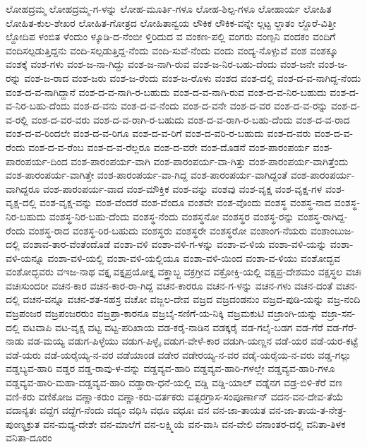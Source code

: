 ಲೋಹದ್ರಮ್ಮ
ಲೋಹದ್ರಮ್ಮ-ಗ-ಳನ್ನು
ಲೋಹ-ಮೂರ್ತಿ-ಗಳೂ
ಲೋಹ-ಶಿಲ್ಪ-ಗಳೂ
ಲೋಹಾರ್ಯ
ಲೋಹಿತ
ಲೋಹಿತ-ಕುಲ-ಶೇಖರ
ಲೋಹಿತ-ಗೋತ್ರದ
ಲೋಹಿತಾನ್ವಯ
ಲೌಕಿಕ
ಲೌಕಿಕ-ವನ್ನೇ
ಲ್ಗಟ್ಟ
ಲ್ದಾತಂ
ಲ್ದೊರೆ-ವಿತ್ತೀ
ಲ್ದೋದಿಪ
ಳಂಬಿತ
ಳೆಂದುಂ
ಳ್ಕೂಡಿ-ದ-ನೆಂಬೀ
ಳ್ತಿರಿದುದ
ವ
ವಂಕಣ-ಪಲ್ಲಿ
ವಂಗರು
ವಂಣ್ಪನಿ
ವಂದಕಂ
ವಂದಿಗೆ
ವಂದಿಸಲ್ಪಡುತ್ತಿದ್ದನು
ವಂದಿ-ಸಲ್ಪಡುತ್ತಿದ್ದ-ನೆಂದು
ವಂದಿ-ಸುವೆ-ನೆಂದು
ವಂದು
ವಂದ್ಯ-ನೊಳ್ಪುವೆ
ವಂಶ
ವಂಶಕ್ಕೂ
ವಂಶಕ್ಕೆ
ವಂಶ-ಗಳು
ವಂಶ-ಜ-ನಾ-ಗಿದ್ದು
ವಂಶ-ಜ-ನಾಗಿ-ರುವ
ವಂಶ-ಜ-ನಿರ-ಬಹು-ದೆಂದು
ವಂಶ-ಜನೇ
ವಂಶ-ಜ-ರನ್ನು
ವಂಶ-ಜ-ರಾದ
ವಂಶ-ಜರು
ವಂಶ-ಜ-ರೆಂದು
ವಂಶ-ಜ-ರೊಳು
ವಂಶದ
ವಂಶ-ದಲ್ಲಿ
ವಂಶ-ದ-ವ-ನಾಗಿದ್ದ-ನೆಂದು
ವಂಶ-ದ-ವ-ನಾಗಿದ್ದಾನೆ
ವಂಶ-ದ-ವ-ನಾಗಿ-ರ-ಬಹುದು
ವಂಶ-ದ-ವ-ನಾಗಿ-ರುವ
ವಂಶ-ದ-ವ-ನಿರ-ಬಹುದು
ವಂಶ-ದ-ವ-ನಿರ-ಬಹು-ದೆಂದು
ವಂಶ-ದ-ವನು
ವಂಶ-ದ-ವ-ನೆಂದು
ವಂಶ-ದ-ವನೇ
ವಂಶ-ದ-ವರ
ವಂಶ-ದ-ವ-ರನ್ನು
ವಂಶ-ದ-ವ-ರಲ್ಲಿ
ವಂಶ-ದ-ವರ-ವರು
ವಂಶ-ದ-ವ-ರಾಗಿ-ರ-ಬಹುದು
ವಂಶ-ದ-ವ-ರಾಗಿ-ರ-ಬಹು-ದೆಂದು
ವಂಶ-ದ-ವ-ರಾದ
ವಂಶ-ದ-ವ-ರಿಂದಲೇ
ವಂಶ-ದ-ವ-ರಿಗೂ
ವಂಶ-ದ-ವ-ರಿಗೆ
ವಂಶ-ದ-ವರಿ-ರ-ಬಹುದು
ವಂಶ-ದ-ವರು
ವಂಶ-ದ-ವ-ರೆಂದು
ವಂಶ-ದ-ವ-ರೆಂಬ
ವಂಶ-ದ-ವ-ರೆಲ್ಲರೂ
ವಂಶ-ದ-ವರೇ
ವಂಶ-ದೊಡನೆ
ವಂಶ-ಪಾರಂಪರ್ಯ
ವಂಶ-ಪಾರಂಪರ್ಯ-ದಿಂದ
ವಂಶ-ಪಾರಂಪರ್ಯ-ವಾಗಿ
ವಂಶ-ಪಾರಂಪರ್ಯ-ವಾ-ಗಿತ್ತು
ವಂಶ-ಪಾರಂಪರ್ಯ-ವಾಗಿತ್ತೆಂದು
ವಂಶ-ಪಾರಂಪರ್ಯ-ವಾಗಿತ್ತೇ
ವಂಶ-ಪಾರಂಪರ್ಯ-ವಾ-ಗಿದ್ದ
ವಂಶ-ಪಾರಂಪರ್ಯ-ವಾಗಿದ್ದಂತೆ
ವಂಶ-ಪಾರಂಪರ್ಯ-ವಾಗಿದ್ದರೂ
ವಂಶ-ಪಾರಂಪರ್ಯ-ವಾದ
ವಂಶ-ಮೌಕ್ತಿಕ
ವಂಶ-ವನ್ನು
ವಂಶವು
ವಂಶ-ವೃಕ್ಷ
ವಂಶ-ವೃಕ್ಷ-ಗಳ
ವಂಶ-ವೃಕ್ಷ-ದಲ್ಲಿ
ವಂಶ-ವೃಕ್ಷ-ವನ್ನು
ವಂಶ-ವೆಂದರೆ
ವಂಶ-ವೆಂದೂ
ವಂಶವೇ
ವಂಶ-ವೊಂದು
ವಂಶಸ್ಥ
ವಂಶಸ್ಥ-ನಾದ
ವಂಶಸ್ಥ-ನಿರ-ಬಹುದು
ವಂಶಸ್ಥ-ನಿರ-ಬಹು-ದೆಂದು
ವಂಶಸ್ಥ-ನೆಂದು
ವಂಶಸ್ಥನೋ
ವಂಶಸ್ಥರ
ವಂಶಸ್ಥ-ರನ್ನು
ವಂಶಸ್ಥ-ರಾಗಿದ್ದ-ರೆಂದು
ವಂಶಸ್ಥ-ರಾದ
ವಂಶಸ್ಥ-ರಿರ-ಬಹುದು
ವಂಶಸ್ಥರು
ವಂಶಸ್ಥರೇ
ವಂಶಸ್ಥರೋ
ವಂಶಾಂಗ-ನೆಯರು
ವಂಶಾಂಬುಜ-ದಲ್ಲಿ
ವಂಶಾವ-ತಾರ-ವೆಂತೆಂದೊಡೆ
ವಂಶಾ-ವಳಿ
ವಂಶಾ-ವಳಿ-ಗ-ಳನ್ನು
ವಂಶಾ-ವ-ಳಿಯ
ವಂಶಾ-ವಳಿ-ಯನ್ನು
ವಂಶಾ-ವಳಿ-ಯನ್ನೂ
ವಂಶಾ-ವಳಿ-ಯಲ್ಲಿ
ವಂಶಾ-ವಳಿ-ಯಲ್ಲಿಯೂ
ವಂಶಾ-ವಳಿ-ಯಿಂದ
ವಂಶಾ-ವ-ಳಿಯು
ವಂಶೋದ್ಭವ
ವಂಶೋದ್ಭವರು
ವಇಜ-ನಾಥ
ವಕ್ತೃ
ವಕ್ತೃಪ್ರಯೋಕ್ತೃ
ವಕ್ತ್ರಾಬ್ಜ
ವಕ್ರಗ್ರೀವ
ವಕ್ರೋಕ್ತಿ-ಯಲ್ಲಿ
ವಕ್ಷಪ್ರ-ದೇಶಮಂ
ವಕ್ಷಸ್ಥಲ
ವಚಃ
ವಚಃಸುಂದರೀ
ವಚನ-ಕಾರ
ವಚನ-ಕಾರ-ರಾ-ಗಿದ್ದ
ವಚನ-ಕಾರರೂ
ವಚನ-ಗ-ಳನ್ನು
ವಚನ-ಗಳು
ವಚನ-ದಂತೆ
ವಚನ-ದಲ್ಲಿ
ವಚನ-ವನ್ನೂ
ವಚನ-ಶತ-ಸಹಸ್ರ
ವಚೋ
ವಜ್ಜಲ-ದೇವ
ವಜ್ರದ
ವಜ್ರದಂಡನುಂ
ವಜ್ರದ-ಪುಡಿ-ಯನ್ನು
ವಜ್ರ-ನಂದಿ
ವಜ್ರಪಂಜರ
ವಜ್ರಪಂಜರರುಂ
ವಜ್ರಪ್ರಾ-ಕಾರನೂ
ವಜ್ರಬೈ-ಸಣಿಗೆ-ಯ-ನಿಕ್ಕಿ
ವಜ್ರಮಕುಟಿ
ವಜ್ರಾಂಗಿ-ಯನ್ನು
ವಜ್ರಾ-ಸನ-ದಲ್ಲಿ
ವಟವಾಪಿ
ವಟ-ವೃಕ್ಷ
ವಟ್ಟ
ವಟ್ಟ-ಪರಿಖಾಯ
ವಡ-ಕರೈ-ನಾಡಿನ
ವಡಕ್ಕರೈ
ವಡ-ಗಲೈ-ಬಡಗ
ವಡ-ಗೆರೆ
ವಡ-ಗೆರೆ-ನಾಡು
ವಡ-ಮಯ್ಯ
ವಡುಗ-ಪಿಳ್ಳೆಯು
ವಡುಗ-ಪಿಳ್ಳೈ
ವಡುಗ-ವೇಳೆ-ಕಾರ
ವಡುಗಿ-ಯಣ್ಣನ
ವಡೆ-ಯರ
ವಡೆ-ಯರ-ಕಟ್ಟೆ
ವಡೆ-ಯರು
ವಡೆ-ಯರೈಯ್ಯ-ನ-ವರ
ವಡೆಯಾಂಡ
ವಡೇರ
ವಡೇರಯ್ಯ-ನ-ವರ
ವಡೈ-ಯರೈಯ-ನ-ವರು
ವಡ್ಡ-ಗಲ್ಲು
ವಡ್ಡಬ್ಯವ-ಹಾರಿ
ವಡ್ಡರ
ವಡ್ಡ-ರಾವು-ಳ-ವನ್ನು
ವಡ್ಡವ್ಯವ-ಹಾರಿ
ವಡ್ಡವ್ಯವ-ಹಾರಿ-ಗಳಲ್ಲೇ
ವಡ್ಡವ್ಯವ-ಹಾರಿ-ಗಳೂ
ವಡ್ಡವ್ಯವ-ಹಾರಿ-ಮಹಾ-ವಡ್ಡವ್ಯವ-ಹಾರಿ
ವಡ್ಡಾರಾ-ಧನೆ-ಯಲ್ಲಿ
ವಡ್ಡಿ
ವಡ್ಡಿ-ಯಾಲ್
ವಡ್ನೆನಗ
ವಡ್ರ-ಬಿಳಿ-ಕೆರೆ
ವಣ
ವಣಿ-ಕರು
ವಣಿಕೋಜ
ವಣ್ಣಾ-ಕರುಂ
ವಣ್ಣಾ-ಕರು-ವರ್ತಕರು
ವತ್ಸರಗ್ರಾಸ-ಸಂಪೂರ್ಣಾನ್
ವದನ-ವನ-ದೇವ-ತೆಯೆ
ವದಾನ್ಯತಃ
ವದ್ದೆಗ
ವದ್ದೆಗ-ನೆಂದು
ವದ್ಯಂ
ವಧಿಸಿ
ವಧೂ
ವಧೂಃ
ವನ
ವನ-ಜಾ-ತಾಯತ
ವನ-ಜಾ-ತಾಯ-ತ-ನೇತ್ರ-ಪುಂಣ್ಯಕ್ರುತ
ವನ-ಮಧ್ಯ-ದೇಶೇ
ವನ-ಮಾಲೆಗೆ
ವನ-ಲಕ್ಷ್ಮಿಯೆ
ವನ-ವಾಸಿ
ವನ-ವೇಲಿ
ವನಾಂತರ-ದಲ್ಲಿ
ವನಿತಾ-ತಿಳಕ
ವನಿತಾ-ದೂರಂ
